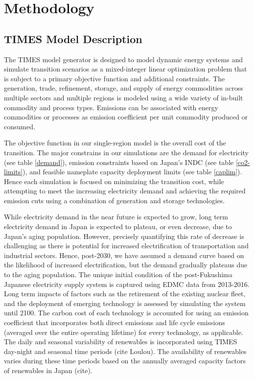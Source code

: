 \section{Methodology} \label{method}
\subsection{TIMES Model Description}
The \gls{TIMES} model generator is designed to model dynamic energy systems and simulate transition scenarios as a mixed-integer linear optimization problem that is subject to a primary objective function and additional constraints. The generation, trade, refinement, storage, and supply of energy commodities across multiple sectors and multiple regions is modeled using a wide variety of in-built commodity and process types. Emissions can be associated with energy commodities or processes as emission coefficient per unit commodity produced or consumed. 

The objective function in our single-region model is the overall cost of the transition. The major constrains in our simulations are the demand for electricity (see table \ref{demand}), emission constraints based on Japan's \gls{INDC} (see table \ref{co2-limits}), and feasible nameplate capacity deployment limits (see table \ref{caplim}). Hence each simulation is focused on minimizing the transition cost, while attempting to meet the increasing electricity demand and achieving the required emission cuts using a combination of generation and storage technologies. 

While electricity demand in the near future is expected to grow, long term electricity demand in Japan is expected to plateau, or even decrease, due to Japan's aging population. However, precisely quantifying this rate of decrease is challenging as there is potential for increased electrification of  transportation and industrial sectors. Hence, post-2030, we have assumed a demand curve based on the likelihood of increased electrification, but the demand gradually plateaus due to the aging population. The unique initial condition of the post-Fukushima Japanese electricity supply system is captured using \gls{EDMC} data from 2013-2016. Long term impacts of factors such as the retirement of the existing nuclear fleet, and the deployment of emerging technology is assessed by simulating the system until 2100. The carbon cost of each technology is accounted for using an emission coefficient that incorporates both direct emissions and life cycle emissions (averaged over the entire operating lifetime) for every technology, as applicable. The daily and seasonal variability of renewables is incorporated using \gls{TIMES} day-night and seasonal time periods (cite Loulou). The availability of renewables varies during these time periods based on the annually averaged capacity factors of renewables in Japan (cite).


